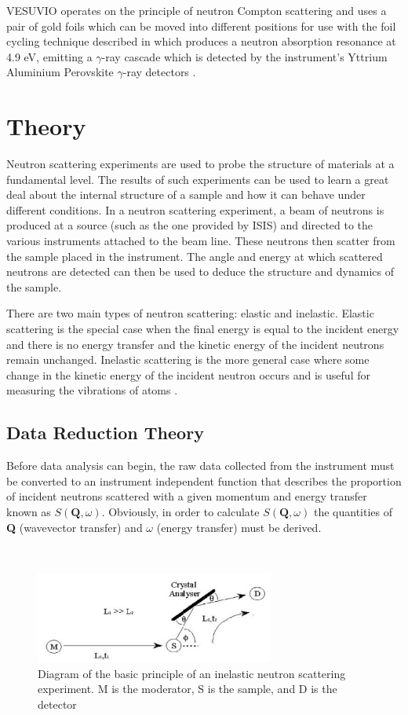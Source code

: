 \documentclass[paper=a4, fontsize=11pt]{scrartcl}	%
\numberwithin{equation}{section}															%
\numberwithin{figure}{section}																%
\numberwithin{table}{section}																%
\begin{document}
VESUVIO operates on the principle of neutron Compton scattering and uses a pair of gold foils which can be moved into different positions for use with the foil cycling technique described in \cite{schooneveld2006foil} which produces a neutron absorption resonance at 4.9 eV, emitting a $\gamma$-ray cascade which is detected by the instrument's Yttrium Aluminium Perovskite $\gamma$-ray detectors \cite{mayers2010user}.

\section{Theory}
Neutron scattering experiments are used to probe the structure of materials at a fundamental level. The results of such experiments can be used to learn a great deal about the internal structure of a sample and how it can behave under different conditions. In a neutron scattering experiment, a beam of neutrons is produced at a source (such as the one provided by ISIS) and directed to the various instruments attached to the beam line. These neutrons then scatter from the sample placed in the instrument. The angle and energy at which scattered neutrons are detected can then be used to deduce the structure and dynamics of the sample.

There are two main types of neutron scattering: elastic and inelastic. Elastic scattering is the special case when the final energy is equal to the incident energy and there is no energy transfer and the kinetic energy of the incident neutrons remain unchanged. Inelastic scattering is the more general case where some change in the kinetic energy of the incident neutron occurs and is useful for measuring the vibrations of atoms \cite{rpynn2008}.


\subsection{Data Reduction Theory}
Before data analysis can begin, the raw data collected from the instrument must be converted to an instrument independent function that describes the proportion of incident neutrons scattered with a given momentum and energy transfer known as $S(\mathbf{Q},\omega)$. Obviously, in order to calculate $S(\mathbf{Q},\omega)$ the quantities of \textbf{Q} (wavevector transfer) and $\omega$ (energy transfer) must be derived.

\mbox{ }\\
\begin{figure}[H]
\centering
\includegraphics[width=0.7\textwidth]{img/instrument-diagram.png}
\caption{Diagram of the basic principle of an inelastic neutron scattering experiment. M is the moderator, S is the sample, and D is the detector \cite{smukhopadhyay2014}}
\label{fig:instrument-setup}
\end{figure}
\end{document}
